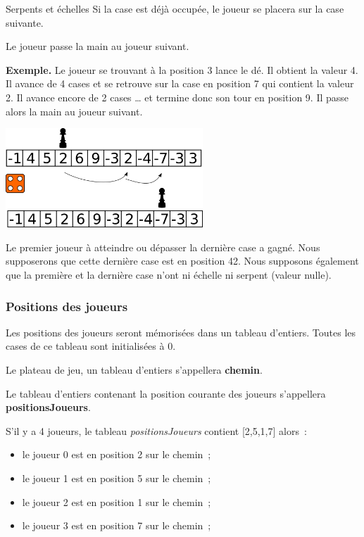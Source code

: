 \begin{Exercice}{Serpents et échelles}
			Si la case est déjà occupée, le joueur se placera sur la case
			suivante. 
		
			Le joueur passe la main au joueur suivant. 
			
			\textbf{Exemple.} Le joueur se trouvant à la position 3 lance le dé.
			Il obtient la valeur 4. Il avance de 4 cases et se retrouve sur la
			case en position 7 qui contient la valeur 2. Il avance encore de
			2 cases … et termine donc son tour en position 9. Il passe alors la
			main au joueur suivant.
		
			\begin{center}
				\includegraphics[width=280px]{images/snake-1}
			\end{center}
			
			Le premier joueur à atteindre ou dépasser la dernière case a gagné.
			Nous supposerons que cette dernière case est en position 42. Nous
			supposons également que la première et la dernière case n’ont ni
			échelle ni serpent (valeur nulle).
	
		\subsubsection*{Positions des joueurs}
		
			Les positions des joueurs seront mémorisées dans un tableau
			d’entiers.  Toutes les cases de ce tableau sont initialisées à 0. 
		
			Le plateau de jeu, un tableau d’entiers s’appellera \textbf{chemin}. 
		
			Le tableau d’entiers contenant la position courante des joueurs
			s’appellera \textbf{positionsJoueurs}. 
		
			S’il y a 4 joueurs, le tableau \textit{positionsJoueurs} contient 
			[2,5,1,7] alors~:
			\begin{itemize}
				\item le joueur 0 est en position 2 sur le chemin~;
				\item le joueur 1 est en position 5 sur le chemin~;
				\item le joueur 2 est en position 1 sur le chemin~;
				\item le joueur 3 est en position 7 sur le chemin~;
			\end{itemize}
				

\end{Exercice}
